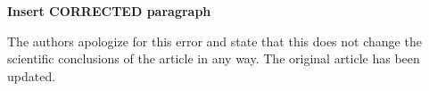 \documentclass[utf8]{frontiers_correction}
\begin{document}
\textbf{Insert CORRECTED paragraph}\par %

The authors apologize for this error and state that this does not change the scientific conclusions of the article in any way. The original article has been updated.







%
%
\end{document}

